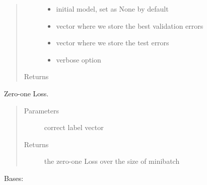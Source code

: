 \documentclass[letterpaper,10pt,english]{sphinxmanual}
\begin{document}
\begin{fulllineitems}
\begin{fulllineitems}
\begin{quote}
\begin{description}
\begin{itemize}
\item {} 
 \textendash{} initial model, set as None by default

\item {} 
 \textendash{} vector where we store the best validation errors

\item {} 
 \textendash{} vector where we store the test errors

\item {} 
 \textendash{} verbose option

\end{itemize}

\item[{Returns}] \leavevmode


\end{description}\end{quote}

\end{fulllineitems}


\begin{fulllineitems}
\label{\detokenize{index:classifiers.logistic.LogisticRegression.zero_one}}
Zero-one Loss.
\begin{quote}\begin{description}
\item[{Parameters}] \leavevmode
{} \textendash{} correct label vector

\item[{Returns}] \leavevmode
the zero-one Loss over the size of minibatch

\end{description}\end{quote}

\end{fulllineitems}


\end{fulllineitems}

\label{\detokenize{index:module-classifiers.mlp}}

\begin{fulllineitems}
\label{\detokenize{index:classifiers.mlp.HiddenLayer}}
Bases: 

\end{fulllineitems}
\end{document}
